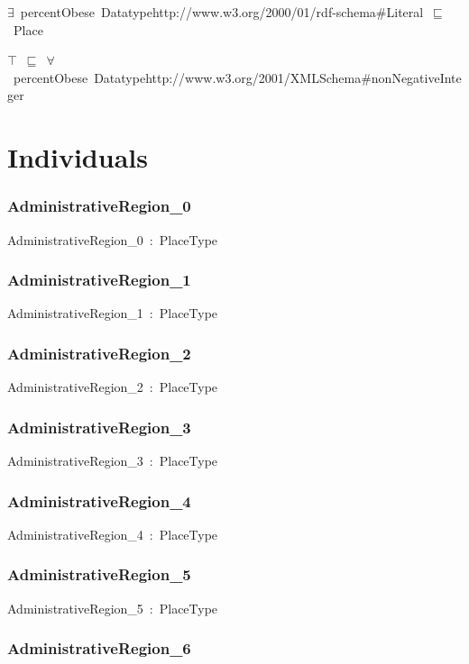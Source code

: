 \documentclass{article}
\begin{document}
\ensuremath{\exists}~percentObese~Datatypehttp://www.w3.org/2000/01/rdf-schema#Literal~\ensuremath{\sqsubseteq}~Place

\ensuremath{\top}~\ensuremath{\sqsubseteq}~\ensuremath{\forall}~percentObese~Datatypehttp://www.w3.org/2001/XMLSchema#nonNegativeInteger

\section*{Individuals}\subsubsection*{AdministrativeRegion\_0}

AdministrativeRegion\_0~:~PlaceType

\subsubsection*{AdministrativeRegion\_1}

AdministrativeRegion\_1~:~PlaceType

\subsubsection*{AdministrativeRegion\_2}

AdministrativeRegion\_2~:~PlaceType

\subsubsection*{AdministrativeRegion\_3}

AdministrativeRegion\_3~:~PlaceType

\subsubsection*{AdministrativeRegion\_4}

AdministrativeRegion\_4~:~PlaceType

\subsubsection*{AdministrativeRegion\_5}

AdministrativeRegion\_5~:~PlaceType

\subsubsection*{AdministrativeRegion\_6}
\end{document}

